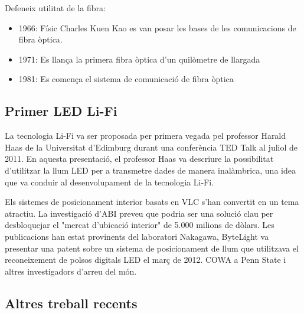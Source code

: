 Defeneix utilitat de la fibra:
\begin{itemize}
    \item 1966: Físic Charles Kuen Kao es van posar les bases de les comunicacions de fibra òptica.
    \item 1971: Es llança la primera fibra òptica d'un quilòmetre de llargada
    \item 1981: Es comença el sistema de comunicació de fibra òptica 
\end{itemize}



\subsection*{Primer LED Li-Fi}

La tecnologia Li-Fi va ser proposada per primera vegada pel professor Harald Haas de la Universitat d'Edimburg durant una conferència TED Talk al juliol de 2011. En aquesta presentació, el professor Haas va descriure la possibilitat d'utilitzar la llum LED per a transmetre dades de manera inalàmbrica, una idea que va conduir al desenvolupament de la tecnologia Li-Fi.

Els sistemes de posicionament interior basats en VLC s'han convertit en un tema atractiu. La investigació d'ABI preveu que podria ser una solució clau per desbloquejar el "mercat d'ubicació interior" de 5.000 milions de dòlars. Les publicacions han estat provinents del laboratori Nakagawa, ByteLight va presentar una patent sobre un sistema de posicionament de llum que utilitzava el reconeixement de polsos digitals LED el març de 2012. COWA a Penn State i altres investigadors d'arreu del món.


\subsection*{Altres treball recents}


